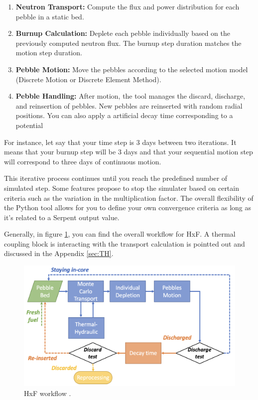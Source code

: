 \documentclass{article}
\begin{document}
\begin{enumerate}
    \item \textbf{Neutron Transport:} Compute the flux and power distribution for each pebble in a static bed.
    \item \textbf{Burnup Calculation:} Deplete each pebble individually based on the previously computed neutron flux. The burnup step duration matches the motion step duration.
    \item \textbf{Pebble Motion:} Move the pebbles according to the selected motion model (Discrete Motion or Discrete Element Method).
    \item \textbf{Pebble Handling:} After motion, the tool manages the discard, discharge, and reinsertion of pebbles. New pebbles are reinserted with random radial positions. You can also apply a artificial decay time corresponding to a potential 
\end{enumerate}

For instance, let say that your time step is 3 days between two iterations. It means that your burnup step will be 3 days and that your sequential motion step will correspond to three days of continuous motion.

This iterative process continues until you reach the predefined number of simulated step. Some features propose to stop the simulater based on certain criteria such as the variation in the multiplication factor. The overall flexibility of the Python tool allows for you to define your own convergence criteria as long as it's related to a Serpent output value.

Generally, in figure \ref{fig:HxF}, you can find the overall workflow for HxF. A thermal coupling block is interacting with the transport calculation is pointted out and discussed in the Appendix \ref{sec:TH}. 

\begin{figure}[] 
    \centering
    \includegraphics[width=1\textwidth]{Figures/HxF.png}
    \caption{HxF workflow \cite{Yves_HxF}.}
    \label{fig:HxF}
\end{figure}
\end{document}
